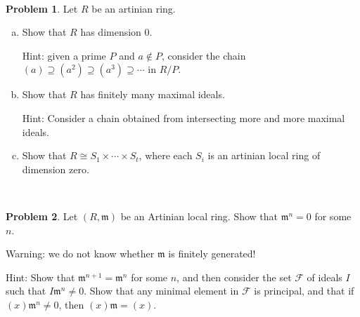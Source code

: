 \documentclass[11pt]{article}
\newcommand{\m}{\mathfrak{m}}
\theoremstyle{definition}
\newtheorem{problem}{Problem}
\begin{document}
\

\begin{problem}
	Let $R$ be an artinian ring.
	\begin{enumerate}[a)]

	\item Show that $R$ has dimension $0$.
	
	Hint: given a prime $P$ and $a \notin P$, consider the chain $(a) \supseteq (a^2) \supseteq (a^3) \supseteq \cdots$ in $R/P$.
	
	\item Show that $R$ has finitely many maximal ideals.
	
	Hint: Consider a chain obtained from intersecting more and more maximal ideals.	
	
	\item Show that $R \cong S_1 \times \cdots \times S_t$, where each $S_i$ is an artinian local ring of dimension zero.
	
	\end{enumerate}
\end{problem}

\

\begin{problem}
	Let $(R, \m)$ be an Artinian local ring. Show that $\m^n = 0$ for some $n$.
		
	Warning: we do not know whether $\m$ is finitely generated!
		
	Hint: Show that $\m^{n+1} = \m^n$ for some $n$, and then consider the set $\mathcal{F}$ of ideals $I$ such that $I \m^n \neq 0$. Show that any minimal element in $\mathcal{F}$ is principal, and that if $(x)\m^n \neq 0$, then $(x) \m = (x)$.
\end{problem}
\end{document}
